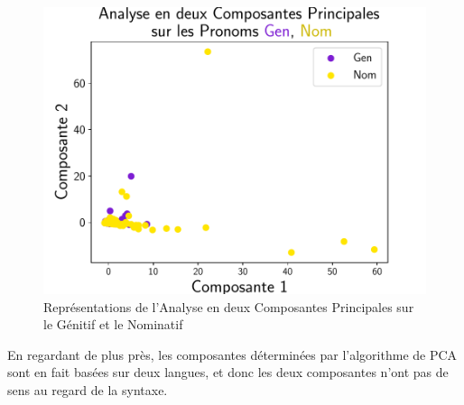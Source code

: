 \documentclass{cours}
\begin{document}
\begin{figure}[H]
\begin{minipage}{.5\textwidth}
	\end{minipage}
	\begin{minipage}{.5\textwidth}
	\begin{center}
	\includegraphics[width=\linewidth]{Figures/Visualisations/pca_Gen_Nom_Pronouns}
	\end{center}
	\end{minipage}
	\caption{Représentations de l'Analyse en deux Composantes Principales sur le Génitif et le Nominatif}
\end{figure}

En regardant de plus près, les composantes déterminées par l'algorithme de PCA sont en fait basées sur deux langues, et donc les deux composantes n'ont pas de sens au regard de la syntaxe.
\end{document}
